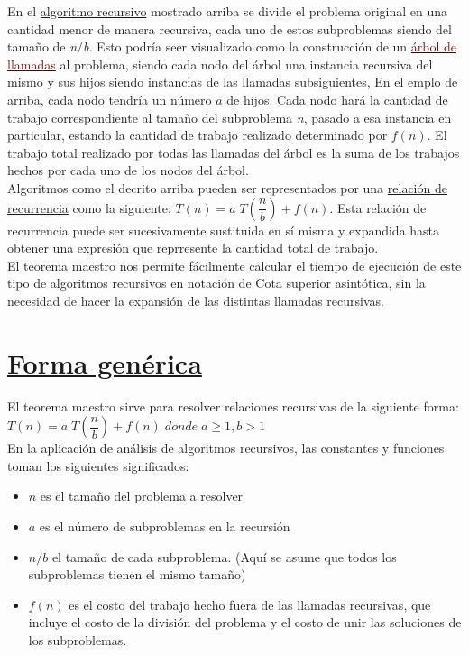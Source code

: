 \documentclass[a4paper,11pt]{article}
\begin{document}
\noindent
En el \href{https://es.wikipedia.org/wiki/Algoritmo_recursivo}{algoritmo recursivo} mostrado arriba se divide el problema original en una cantidad menor de manera recursiva, cada uno de estos subproblemas siendo del tamaño de \textit{n$/$b}. Esto podría seer visualizado como la construcción de un \href{https://es.wikipedia.org/w/index.php?title=árbol_de_llamadas&action=edit&redlink=1}{\textcolor{Maroon}{árbol de llamadas}} al problema, siendo cada nodo del árbol una instancia recursiva del mismo y sus hijos siendo instancias de las llamadas subsiguientes, En el emplo de arriba, cada nodo tendría un número $a$ de hijos. Cada \href{https://es.wikipedia.org/wiki/Nodo}{nodo} hará la cantidad de trabajo correspondiente al tamaño del subproblema \textit{n}, pasado a esa instancia en particular, estando la cantidad de trabajo realizado determinado por \textbf{$f(n)$}. El trabajo total realizado por todas las llamadas del árbol es la suma de los trabajos hechos por cada uno de los nodos del árbol.\\
Algoritmos como el decrito arriba pueden ser representados por una \href{https://es.wikipedia.org/wiki/Relación_de_recurrencia}{relación de recurrencia} como la siguiente: $T(n) = a\;T (\dfrac{n}{b}) + f(n)$. Esta relación de recurrencia puede ser sucesivamente sustituida en sí misma y expandida hasta obtener una expresión que reprresente la cantidad total de trabajo.\cite{Duke_University}\\
El teorema maestro nos permite fácilmente calcular el tiempo de ejecución de este tipo de algoritmos recursivos en notación de Cota superior asintótica, sin la necesidad de hacer la expansión de las distintas llamadas recursivas.


\section[Forma genérica]{\hyperlink{toc}{Forma genérica}}
\noindent{\color {Gray} \rule {\linewidth}{0.1mm}}
El teorema maestro sirve para resolver relaciones recursivas de la siguiente forma:\\
$T(n) = a\; T (\dfrac{n}{b}) + f(n) \;donde\; a \geq 1,b > 1$\\ 
En la aplicación de análisis de algoritmos recursivos, las constantes y funciones toman los siguientes significados:

\begin{itemize}
    \item $n$ es el tamaño del problema a resolver
    \item $a$ es el número de subproblemas en la recursión
    \item $n/b$ el tamaño de cada subproblema. (Aquí se asume que todos los subproblemas tienen el mismo tamaño)
    \item $f(n)$ es el costo del trabajo hecho fuera de las llamadas recursivas, que incluye el costo de la división del problema y el costo de unir las soluciones de los subproblemas.
\end{itemize}
\end{document}
